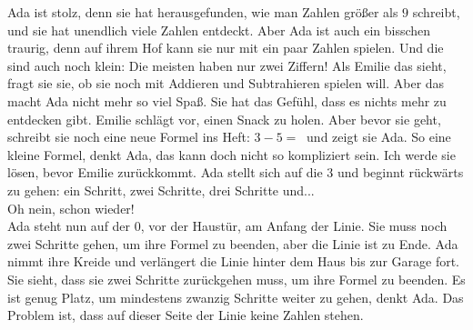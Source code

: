 Ada ist stolz, denn sie hat herausgefunden, wie man Zahlen größer als $9$ schreibt, und sie hat unendlich viele Zahlen entdeckt. 
Aber Ada ist auch ein bisschen traurig, denn auf ihrem Hof kann sie nur mit ein paar Zahlen spielen. Und die sind auch noch klein: Die meisten haben nur zwei Ziffern!
Als Emilie das sieht, fragt sie sie, ob sie noch mit Addieren und Subtrahieren spielen will. 
Aber das macht Ada nicht mehr so viel Spaß. Sie hat das Gefühl, dass es nichts mehr zu entdecken gibt. 
Emilie schlägt vor, einen Snack zu holen. Aber bevor sie geht, schreibt sie noch eine neue Formel ins Heft: $3 - 5 = ~$ und zeigt sie Ada. 
So eine kleine Formel, denkt Ada, das kann doch nicht so kompliziert sein. 
Ich werde sie lösen, bevor Emilie zurückkommt. 
Ada stellt sich auf die $3$ und beginnt rückwärts zu gehen: ein Schritt, zwei Schritte, drei Schritte und...\\
\frqq{}Oh nein, schon wieder!\flqq{}\\
Ada steht nun auf der $0$, vor der Haustür, am Anfang der Linie. 
Sie muss noch zwei Schritte gehen, um ihre Formel zu beenden, aber die Linie ist zu Ende. 
Ada nimmt ihre Kreide und verlängert die Linie hinter dem Haus bis zur Garage fort. 
Sie sieht, dass sie zwei Schritte zurückgehen muss, um ihre Formel zu beenden. 
Es ist genug Platz, um mindestens zwanzig Schritte weiter zu gehen, denkt Ada. 
Das Problem ist, dass auf dieser Seite der Linie keine Zahlen stehen. 

